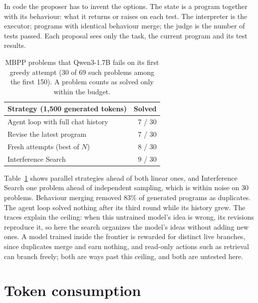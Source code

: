 \documentclass[10pt,twocolumn]{article}
\newcommand{\IS}{Interference Search}
\begin{document}
In code the proposer has to invent the options. The state is a program together with its behaviour: what it returns or raises on each test. The interpreter is the executor; programs with identical behaviour merge; the judge is the number of tests passed. Each proposal sees only the task, the current program and its test results.

\begin{table}[t]
\centering\small
\begin{tabular}{lr}
\toprule
Strategy (1,500 generated tokens) & Solved \\
\midrule
Agent loop with full chat history & 7 / 30 \\
Revise the latest program & 7 / 30 \\
Fresh attempts (best of $N$) & 8 / 30 \\
\IS & 9 / 30 \\
\bottomrule
\end{tabular}
\caption{MBPP problems \citep{austin2021mbpp} that Qwen3-1.7B fails on its first greedy attempt (30 of 69 such problems among the first 150). A problem counts as solved only within the budget.}
\label{tab:code}
\end{table}

Table~\ref{tab:code} shows parallel strategies ahead of both linear ones, and \IS{} one problem ahead of independent sampling, which is within noise on 30 problems. Behaviour merging removed 83\% of generated programs as duplicates. The agent loop solved nothing after its third round while its history grew. The traces explain the ceiling: when this untrained model's idea is wrong, its revisions reproduce it, so here the search organizes the model's ideas without adding new ones. A model trained inside the frontier is rewarded for distinct live branches, since duplicates merge and earn nothing, and read-only actions such as retrieval can branch freely; both are ways past this ceiling, and both are untested here.

\section{Token consumption}
\label{sec:tokens}
\end{document}

